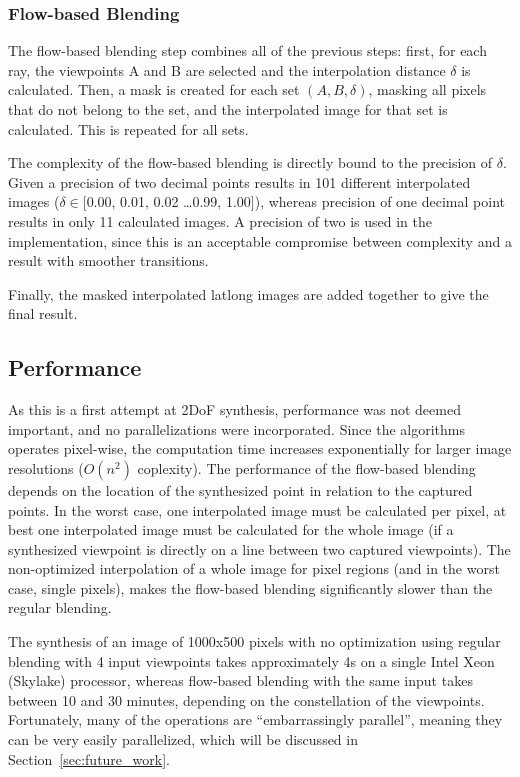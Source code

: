 \subsubsection{Flow-based Blending}
The flow-based blending step combines all of the previous steps: first, for each ray, the viewpoints A and B are selected and the interpolation distance $\delta$ is calculated. Then, a mask is created for each set $(A,B,\delta)$, masking all pixels that do not belong to the set, and the interpolated image for that set is calculated. This is repeated for all sets.

The complexity of the flow-based blending is directly bound to the precision of $\delta$. Given a precision of two decimal points results in 101 different interpolated images ($\delta \in [$0.00, 0.01, 0.02 \ldots 0.99, 1.00$]$), whereas precision of one decimal point results in only 11 calculated images. A precision of two is used in the implementation, since this is an acceptable compromise between complexity and a result with smoother transitions.

Finally, the masked interpolated latlong images are added together to give the final result.

\subsection{Performance}
As this is a first attempt at 2DoF synthesis, performance was not deemed important, and no parallelizations were incorporated. Since the algorithms operates pixel-wise, the computation time increases exponentially for larger image resolutions ($O(n^2)$ coplexity). The performance of the flow-based blending depends on the location of the synthesized point in relation to the captured points. In the worst case, one interpolated image must be calculated per pixel, at best one interpolated image must be calculated for the whole image (if a synthesized viewpoint is directly on a line between two captured viewpoints). The non-optimized interpolation of a whole image for pixel regions (and in the worst case, single pixels), makes the flow-based blending significantly slower than the regular blending.

The synthesis of an image of 1000x500 pixels with no optimization using regular blending with 4 input viewpoints takes approximately 4s on a single Intel Xeon (Skylake) processor, whereas flow-based blending with the same input takes between 10 and 30 minutes, depending on the constellation of the viewpoints.
Fortunately, many of the operations are ``embarrassingly parallel'', meaning they can be very easily parallelized, which will be discussed in Section~\ref{sec:future_work}.

